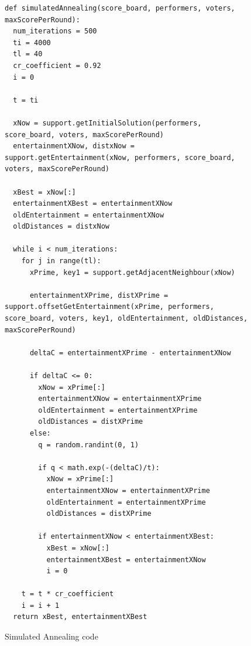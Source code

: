 \documentclass[12pt]{report}
\begin{document}
\begin{figure}[H]
\caption{Simulated Annealing code}
\label{simAnnealingCode}
\begin{lstlisting}
def simulatedAnnealing(score_board, performers, voters, maxScorePerRound):
  num_iterations = 500
  ti = 4000
  tl = 40
  cr_coefficient = 0.92
  i = 0
    
  t = ti
    
  xNow = support.getInitialSolution(performers, score_board, voters, maxScorePerRound)
  entertainmentXNow, distxNow = support.getEntertainment(xNow, performers, score_board, voters, maxScorePerRound)
    
  xBest = xNow[:]
  entertainmentXBest = entertainmentXNow
  oldEntertainment = entertainmentXNow
  oldDistances = distxNow

  while i < num_iterations:
    for j in range(tl):
      xPrime, key1 = support.getAdjacentNeighbour(xNow)
            
      entertainmentXPrime, distXPrime = support.offsetGetEntertainment(xPrime, performers, score_board, voters, key1, oldEntertainment, oldDistances, maxScorePerRound)
            
      deltaC = entertainmentXPrime - entertainmentXNow

      if deltaC <= 0:
        xNow = xPrime[:]
        entertainmentXNow = entertainmentXPrime
        oldEntertainment = entertainmentXPrime
        oldDistances = distXPrime
      else:
        q = random.randint(0, 1)

        if q < math.exp(-(deltaC)/t):
          xNow = xPrime[:]
          entertainmentXNow = entertainmentXPrime
          oldEntertainment = entertainmentXPrime
          oldDistances = distXPrime

        if entertainmentXNow < entertainmentXBest:
          xBest = xNow[:]
          entertainmentXBest = entertainmentXNow
          i = 0
        
    t = t * cr_coefficient
    i = i + 1
  return xBest, entertainmentXBest
\end{lstlisting}
\end{figure}
\end{document}
